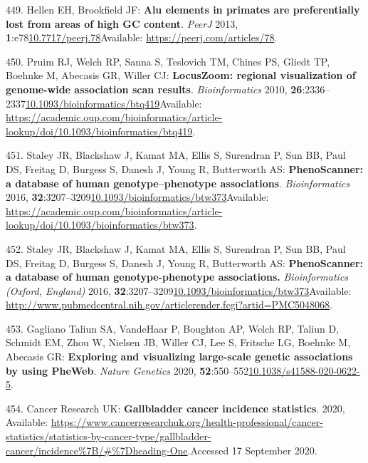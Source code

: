 \documentclass[
]{book}
\begin{document}
\leavevmode\hypertarget{ref-Hellen2013}{}%
449. Hellen EH, Brookfield JF: \textbf{Alu elements in primates are preferentially lost from areas of high GC content}. \emph{PeerJ} 2013, \textbf{1}:e78\href{https://doi.org/10.7717/peerj.78}{10.7717/peerj.78}Available: \url{https://peerj.com/articles/78}.

\leavevmode\hypertarget{ref-Pruim2011}{}%
450. Pruim RJ, Welch RP, Sanna S, Teslovich TM, Chines PS, Gliedt TP, Boehnke M, Abecasis GR, Willer CJ: \textbf{LocusZoom: regional visualization of genome-wide association scan results}. \emph{Bioinformatics} 2010, \textbf{26}:2336--2337\href{https://doi.org/10.1093/bioinformatics/btq419}{10.1093/bioinformatics/btq419}Available: \url{https://academic.oup.com/bioinformatics/article-lookup/doi/10.1093/bioinformatics/btq419}.

\leavevmode\hypertarget{ref-Staley2016}{}%
451. Staley JR, Blackshaw J, Kamat MA, Ellis S, Surendran P, Sun BB, Paul DS, Freitag D, Burgess S, Danesh J, Young R, Butterworth AS: \textbf{PhenoScanner: a database of human genotype--phenotype associations}. \emph{Bioinformatics} 2016, \textbf{32}:3207--3209\href{https://doi.org/10.1093/bioinformatics/btw373}{10.1093/bioinformatics/btw373}Available: \url{https://academic.oup.com/bioinformatics/article-lookup/doi/10.1093/bioinformatics/btw373}.

\leavevmode\hypertarget{ref-Kamat2019}{}%
452. Staley JR, Blackshaw J, Kamat MA, Ellis S, Surendran P, Sun BB, Paul DS, Freitag D, Burgess S, Danesh J, Young R, Butterworth AS: \textbf{PhenoScanner: a database of human genotype-phenotype associations.} \emph{Bioinformatics (Oxford, England)} 2016, \textbf{32}:3207--3209\href{https://doi.org/10.1093/bioinformatics/btw373}{10.1093/bioinformatics/btw373}Available: \url{http://www.pubmedcentral.nih.gov/articlerender.fcgi?artid=PMC5048068}.

\leavevmode\hypertarget{ref-GaglianoTaliun2020}{}%
453. Gagliano Taliun SA, VandeHaar P, Boughton AP, Welch RP, Taliun D, Schmidt EM, Zhou W, Nielsen JB, Willer CJ, Lee S, Fritsche LG, Boehnke M, Abecasis GR: \textbf{Exploring and visualizing large-scale genetic associations by using PheWeb}. \emph{Nature Genetics} 2020, \textbf{52}:550--552\href{https://doi.org/10.1038/s41588-020-0622-5}{10.1038/s41588-020-0622-5}.

\leavevmode\hypertarget{ref-CancerResearchUK2020}{}%
454. Cancer Research UK: \textbf{Gallbladder cancer incidence statistics}. 2020, Available: \url{https://www.cancerresearchuk.org/health-professional/cancer-statistics/statistics-by-cancer-type/gallbladder-cancer/incidence\%7B/\#\%7Dheading-One}.Accessed 17 September 2020.
\end{document}
